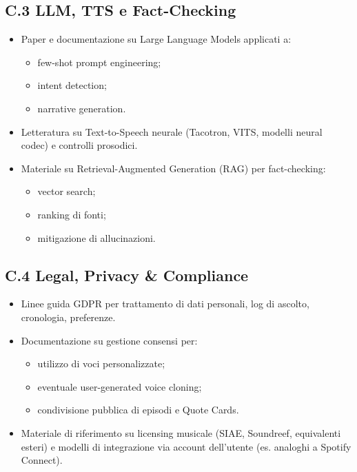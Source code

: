 \documentclass[11pt,a4paper]{article}
\begin{document}
\subsection*{C.3 LLM, TTS e Fact-Checking}

\begin{itemize}[leftmargin=*]
    \item Paper e documentazione su Large Language Models applicati a:
    \begin{itemize}
        \item few-shot prompt engineering;
        \item intent detection;
        \item narrative generation.
    \end{itemize}
    \item Letteratura su Text-to-Speech neurale (Tacotron, VITS, modelli neural codec) e controlli prosodici.
    \item Materiale su Retrieval-Augmented Generation (RAG) per fact-checking:
    \begin{itemize}
        \item vector search;
        \item ranking di fonti;
        \item mitigazione di allucinazioni.
    \end{itemize}
\end{itemize}

\subsection*{C.4 Legal, Privacy \& Compliance}

\begin{itemize}[leftmargin=*]
    \item Linee guida GDPR per trattamento di dati personali, log di ascolto, cronologia, preferenze.
    \item Documentazione su gestione consensi per:
    \begin{itemize}
        \item utilizzo di voci personalizzate;
        \item eventuale user-generated voice cloning;
        \item condivisione pubblica di episodi e Quote Cards.
    \end{itemize}
    \item Materiale di riferimento su licensing musicale (SIAE, Soundreef, equivalenti esteri) e modelli di integrazione via account dell’utente (es. analoghi a Spotify Connect).
\end{itemize}
\end{document}
